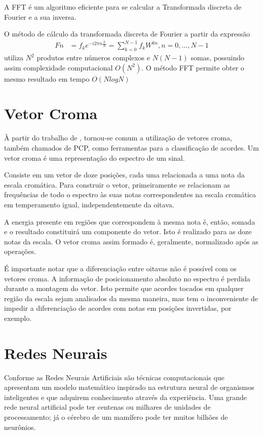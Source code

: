A FFT é um algoritmo eficiente para se calcular a Transformada discreta de Fourier e a sua inversa. 

O método de cálculo da transformada discreta de Fourier a partir da expressão
\begin{equation} \label{eq1}
\begin{split}
Fn & = f_k e^{-i2\pi n\frac{k}{N}} = \sum_{k=0}^{N-1} f_k W^{k n} ,n = 0,...,N-1 
\end{split}
\end{equation}
utiliza \(N^2\) produtos entre números complexos e \(N(N-1)\) somas, possuindo assim complexidade computacional \(O(N^2)\).
O método FFT permite obter o mesmo resultado em tempo \(O(N log N)\) 


\section{Vetor Croma }
\label{cap:conceitos:sec:vetor:croma}


À partir do trabalho de \cite{fujishima1999realtime}, tornou-se comum a utilização de vetores croma, também chamados de \gls{PCP}, como ferramentas para a classificação de acordes. Um vetor croma é uma representação do espectro de um sinal.

Consiste em um vetor de doze posições, cada uma relacionada a uma nota da escala cromática. Para construir o vetor, primeiramente se relacionam as frequências de todo o espectro às suas notas correspondentes na escala cromática em temperamento igual, independentemente da oitava.

A energia presente em regiões que correspondem à mesma nota é, então, somada e o resultado constituirá um componente do vetor. Isto é realizado para as doze notas da escala. O vetor croma assim formado é, geralmente, normalizado após as operações.

É importante notar que a diferenciação entre oitavas não é possível com os vetores croma. A informação de posicionamento absoluto no espectro é perdida durante a montagem do vetor. Isto permite que acordes tocados em qualquer região da escala sejam analisados da mesma maneira, mas tem o inconveniente de impedir a diferenciação de acordes com notas em posições invertidas, por exemplo.

\section{Redes Neurais}
\label{cap:conceitos:sec:redes:neurais}
Conforme  \cite{braga2000redes} as Redes Neurais Artificiais são técnicas computacionais que apresentam um modelo matemático inspirado na estrutura neural de organismos inteligentes e que adquirem conhecimento através da experiência. Uma grande rede neural artificial pode ter centenas ou milhares de unidades de processamento; já o cérebro de um mamífero pode ter muitos bilhões de neurônios.

